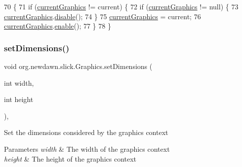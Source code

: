 \begin{DoxyCode}
70                                                     \{
71         \textcolor{keywordflow}{if} (\mbox{\hyperlink{classorg_1_1newdawn_1_1slick_1_1_graphics_aededc15e0b8a4b7f0b9b6dc9ba263251}{currentGraphics}} != current) \{
72             \textcolor{keywordflow}{if} (\mbox{\hyperlink{classorg_1_1newdawn_1_1slick_1_1_graphics_aededc15e0b8a4b7f0b9b6dc9ba263251}{currentGraphics}} != null) \{
73                 \mbox{\hyperlink{classorg_1_1newdawn_1_1slick_1_1_graphics_aededc15e0b8a4b7f0b9b6dc9ba263251}{currentGraphics}}.\mbox{\hyperlink{classorg_1_1newdawn_1_1slick_1_1_graphics_a7979c584c48fc28175289e0012d5c943}{disable}}();
74             \}
75             \mbox{\hyperlink{classorg_1_1newdawn_1_1slick_1_1_graphics_aededc15e0b8a4b7f0b9b6dc9ba263251}{currentGraphics}} = current;
76             \mbox{\hyperlink{classorg_1_1newdawn_1_1slick_1_1_graphics_aededc15e0b8a4b7f0b9b6dc9ba263251}{currentGraphics}}.\mbox{\hyperlink{classorg_1_1newdawn_1_1slick_1_1_graphics_a094766a3a763c402d5d077710b4d3fc5}{enable}}();
77         \}
78     \}
\end{DoxyCode}
\mbox{\label{classorg_1_1newdawn_1_1slick_1_1_graphics_a0e154c1ece7603367974df28f2e38a62}} 
\subsubsection{\texorpdfstring{set\+Dimensions()}{setDimensions()}}
{\footnotesize\ttfamily void org.\+newdawn.\+slick.\+Graphics.\+set\+Dimensions (\begin{DoxyParamCaption}\item[{int}]{width,  }\item[{int}]{height }\end{DoxyParamCaption})\hspace{0.3cm}{\ttfamily [inline]}, {\ttfamily [package]}}

Set the dimensions considered by the graphics context


\begin{DoxyParams}{Parameters}
{\em width} & The width of the graphics context \\
\hline
{\em height} & The height of the graphics context \\
\hline
\end{DoxyParams}

